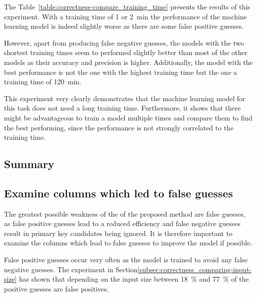 The Table~\ref{table:correctness-compare_training_time} presents the results of this experiment. With a training time of \num{1} or \SI{2}{\minute} the performance of the machine learning model is indeed slightly worse as there are some false positive guesses. %

However, apart from producing false negative guesses, the models with the two shortest training times seem to performed slightly better than most of the other models as their accuracy and precision is higher. Additionally, the model with the best performance is not the one with the highest training time but the one a training time of \SI{120}{\minute}.

This experiment very clearly demonstrates that the machine learning model for this task does not need a long training time. Furthermore, it shows that there might be advantageous to train a model multiple times and compare them to find the best performing, since the performance is not strongly correlated to the training time.






\subsection{Summary}\label{subsec:correctness_conclusions} %


\subsection{Examine columns which led to false guesses}\label{subsec:correctness_examine-false-guesses} %
The greatest possible weakness of the of the proposed method are false guesses, as false positive guesses lead to a reduced efficiency and false negative guesses result in primary key candidates being ignored. It is therefore important to examine the columns which lead to false guesses to improve the model if possible.

False positive guesses occur very often as the model is trained to avoid any false negative guesses. The experiment in Section\ref{subsec:correctness_comparing-input-size} has shown that depending on the input size between \SI{18}{\percent} and \SI{77}{\percent} of the positive guesses are false positives. %

